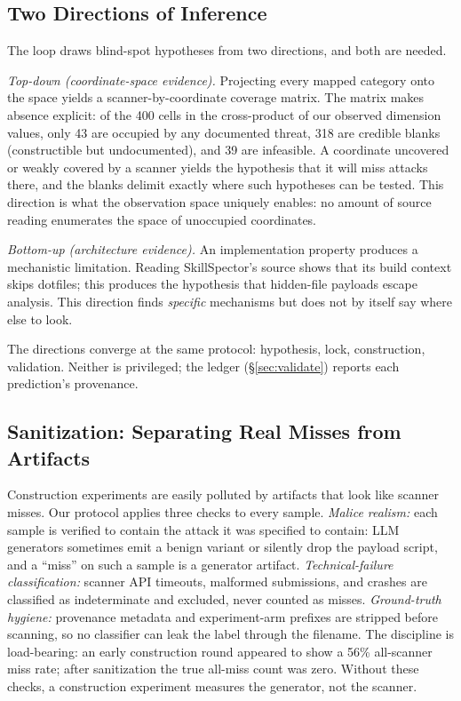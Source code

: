 \documentclass[sigconf,nonacm]{acmart}
\begin{document}
\subsection{Two Directions of Inference}
The loop draws blind-spot hypotheses from two directions, and both are needed.

\emph{Top-down (coordinate-space evidence).} Projecting every mapped category onto the space yields a scanner-by-coordinate coverage matrix. The matrix makes absence explicit: of the 400 cells in the cross-product of our observed dimension values, only 43 are occupied by any documented threat, 318 are credible blanks (constructible but undocumented), and 39 are infeasible. A coordinate uncovered or weakly covered by a scanner yields the hypothesis that it will miss attacks there, and the blanks delimit exactly where such hypotheses can be tested. This direction is what the observation space uniquely enables: no amount of source reading enumerates the space of unoccupied coordinates.

\emph{Bottom-up (architecture evidence).} An implementation property produces a mechanistic limitation. Reading SkillSpector's source shows that its build context skips dotfiles; this produces the hypothesis that hidden-file payloads escape analysis. This direction finds \emph{specific} mechanisms but does not by itself say where else to look.

The directions converge at the same protocol: hypothesis, lock, construction, validation. Neither is privileged; the ledger (\S\ref{sec:validate}) reports each prediction's provenance.

\subsection{Sanitization: Separating Real Misses from Artifacts}
Construction experiments are easily polluted by artifacts that look like scanner misses. Our protocol applies three checks to every sample. \emph{Malice realism:} each sample is verified to contain the attack it was specified to contain: LLM generators sometimes emit a benign variant or silently drop the payload script, and a ``miss'' on such a sample is a generator artifact. \emph{Technical-failure classification:} scanner API timeouts, malformed submissions, and crashes are classified as indeterminate and excluded, never counted as misses. \emph{Ground-truth hygiene:} provenance metadata and experiment-arm prefixes are stripped before scanning, so no classifier can leak the label through the filename. The discipline is load-bearing: an early construction round appeared to show a 56\% all-scanner miss rate; after sanitization the true all-miss count was zero. Without these checks, a construction experiment measures the generator, not the scanner.
\end{document}
